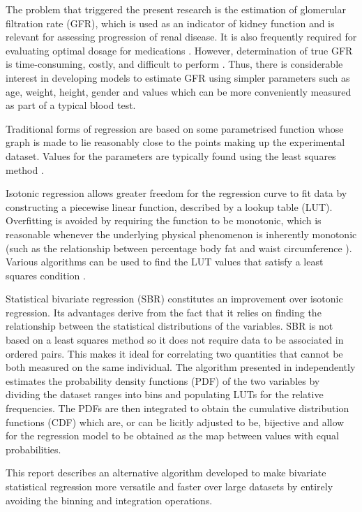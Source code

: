 \documentclass[10pt,final]{siamltex}
\begin{document}
The problem that triggered the present research is the estimation of glomerular filtration rate (GFR), which is used as an indicator of kidney function and is relevant for assessing progression of renal disease. It is also frequently required for evaluating optimal dosage for medications \cite{gfralb, gfrmed}. However, determination of true GFR is time-consuming, costly, and difficult to perform \cite{mgfr, mgfr2}. Thus, there is considerable interest in developing models to estimate GFR using simpler parameters such as age, weight, height, gender and values which can be more conveniently measured as part of a typical blood test.

Traditional forms of regression are based on some parametrised function whose graph is made to lie reasonably close to the points making up the experimental dataset. Values for the parameters are typically found using the least squares method \cite{book}.

Isotonic regression allows greater freedom for the regression curve to fit data by constructing a piecewise linear function, described by a lookup table (LUT). Overfitting is avoided by requiring the function to be monotonic, which is reasonable whenever the underlying physical phenomenon is inherently monotonic (such as the relationship between percentage body fat and waist circumference \cite{fat}). Various algorithms can be used to find the LUT values that satisfy a least squares condition \cite{bestchak, pava}.

Statistical bivariate regression (SBR) constitutes an improvement over isotonic regression. Its advantages derive from the fact that it relies on finding the relationship between the statistical distributions of the variables. SBR is not based on a least squares method so it does not require data to be associated in ordered pairs. This makes it ideal for correlating two quantities that cannot be both measured on the same individual. The algorithm presented in \cite{fiori} independently estimates the probability density functions (PDF) of the two variables by dividing the dataset ranges into bins and populating LUTs for the relative frequencies. The PDFs are then integrated to obtain the cumulative distribution functions (CDF) which are, or can be licitly adjusted to be, bijective and allow for the regression model to be obtained as the map between values with equal probabilities.

This report describes an alternative algorithm developed to make bivariate statistical regression more versatile and faster over large datasets by entirely avoiding the binning and integration operations.
\end{document}
